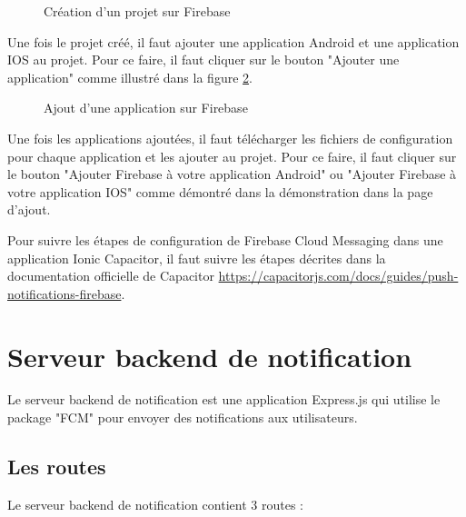 \begin{figure}[H]
    \centering
    \caption{Création d'un projet sur Firebase}
    \label{appendix:firebase_create_project}
\end{figure}

Une fois le projet créé, il faut ajouter une application Android et une application IOS au projet. Pour ce faire, il faut cliquer sur le bouton "Ajouter une application" comme illustré dans la figure \ref{appendix:firebase_add_app}.

\begin{figure}[H]
    \centering
    \caption{Ajout d'une application sur Firebase}
    \label{appendix:firebase_add_app}
\end{figure}

Une fois les applications ajoutées, il faut télécharger les fichiers de configuration pour chaque application et les ajouter au projet. Pour ce faire, il faut cliquer sur le bouton "Ajouter Firebase à votre application Android" ou "Ajouter Firebase à votre application IOS" comme démontré dans la démonstration dans la page d'ajout.

Pour suivre les étapes de configuration de Firebase Cloud Messaging dans une application Ionic Capacitor, il faut suivre les étapes décrites dans la documentation officielle de Capacitor \url{https://capacitorjs.com/docs/guides/push-notifications-firebase}.



\section{Serveur backend de notification}
\label{appendix:backend_notification}

Le serveur backend de notification est une application Express.js qui utilise le package "FCM" pour envoyer des notifications aux utilisateurs.

\subsection{Les routes}

Le serveur backend de notification contient 3 routes :

